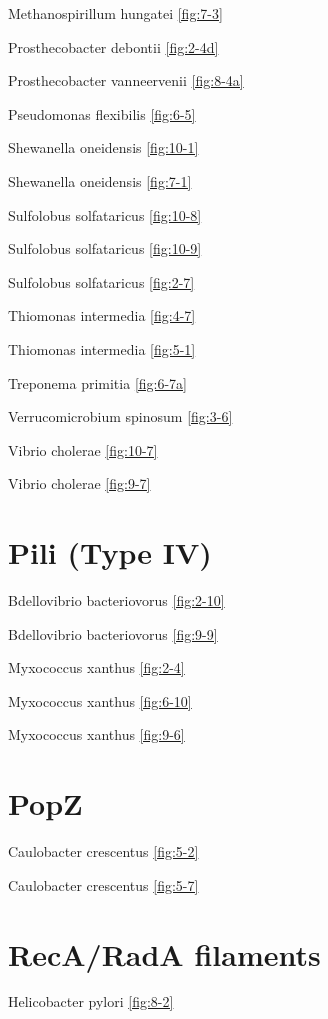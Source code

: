 \documentclass[]{tufte-book}
\begin{document}
Methanospirillum hungatei \ref{fig:7-3}

Prosthecobacter debontii \ref{fig:2-4d}

Prosthecobacter vanneervenii \ref{fig:8-4a}

Pseudomonas flexibilis \ref{fig:6-5}

Shewanella oneidensis \ref{fig:10-1}

Shewanella oneidensis \ref{fig:7-1}

Sulfolobus solfataricus \ref{fig:10-8}

Sulfolobus solfataricus \ref{fig:10-9}

Sulfolobus solfataricus \ref{fig:2-7}

Thiomonas intermedia \ref{fig:4-7}

Thiomonas intermedia \ref{fig:5-1}

Treponema primitia \ref{fig:6-7a}

Verrucomicrobium spinosum \ref{fig:3-6}

Vibrio cholerae \ref{fig:10-7}

Vibrio cholerae \ref{fig:9-7}

\section{\texorpdfstring{\textbf{Pili (Type
IV)}}{Pili (Type IV)}}\label{pili-type-iv}

Bdellovibrio bacteriovorus \ref{fig:2-10}

Bdellovibrio bacteriovorus \ref{fig:9-9}

Myxococcus xanthus \ref{fig:2-4}

Myxococcus xanthus \ref{fig:6-10}

Myxococcus xanthus \ref{fig:9-6}

\section{\texorpdfstring{\textbf{PopZ}}{PopZ}}\label{popz}

Caulobacter crescentus \ref{fig:5-2}

Caulobacter crescentus \ref{fig:5-7}

\section{\texorpdfstring{\textbf{RecA/RadA
filaments}}{RecA/RadA filaments}}\label{recarada-filaments}

Helicobacter pylori \ref{fig:8-2}
\end{document}
